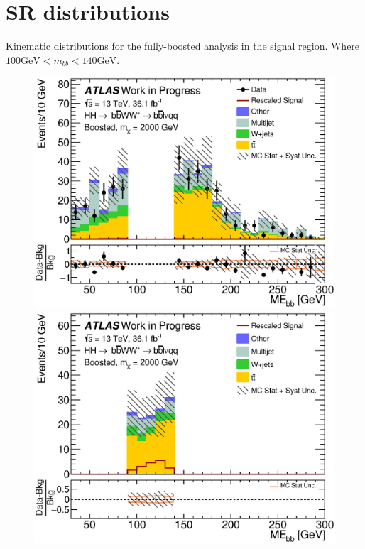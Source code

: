 \chapter{SR distributions}
\label{app:sr_john}
Kinematic distributions for the fully-boosted analysis in the signal region. Where ${100 \mathrm{GeV} < m_{bb} < 140 \mathrm{GeV}}$.
\begin{figure}[h]
\begin{center}
\includegraphics[scale=0.33]{figures/kinplots/C_2tag_mbbcr_elec_presel_met50_HbbMass}
\includegraphics[scale=0.33]{figures/kinplots/C_2tag_SR_muon_presel_met50_HbbMass}\\

\end{center}
\end{figure}
